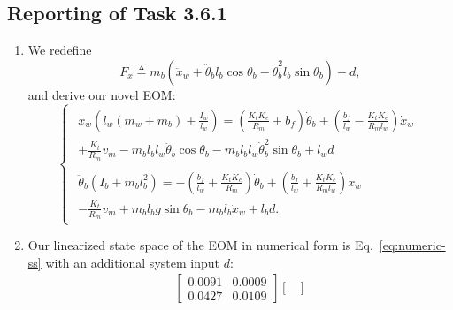 \documentclass[11pt]{article} %
\begin{document}
\subsection*{Reporting of Task 3.6.1}
\begin{enumerate}
\item %
  We redefine
  $$
  F_x \triangleq m_b\left(
    \ddot{x}_w
    + \ddot{\theta}_b l_b \cos\theta_b
    - \dot{\theta}^2_b l_b \sin\theta_b
  \right)
  - d,
  $$
  and derive our novel \ac{EOM}:
  \begin{equation}\label{eq:system-novel}
    \begin{cases}
      \begin{aligned}
        \ddot{x}_w\left(l_w(m_w + m_b) + \frac{I_w}{l_w}\right) =
        \left(
          \frac{K_t K_e}{R_m}
          + b_f
        \right)\dot{\theta}_b
        +
        \left(
          \frac{b_f}{l_w}
          -
          \frac{K_t K_e}{R_m l_w}
        \right)\dot{x}_w
        \\
        + \frac{K_t}{R_m}v_m
        - m_b l_b l_w \ddot{\theta}_b \cos\theta_b
        - m_b l_b l_w \dot{\theta}_b^2 \sin\theta_b
        + l_w d
      \end{aligned}\\
      \begin{aligned}
        \ddot{\theta}_b\left(I_b + m_b l_b^2\right)
        =
        -\left(
          \frac{b_f}{l_w}
          +
          \frac{K_t K_e}{R_m}
        \right)\dot{\theta}_b
        + \left(
          \frac{b_f}{l_w} + \frac{K_t K_e}{R_m l_w}
        \right)\dot{x}_w
        \\
        - \frac{K_t}{R_m}v_m
        + m_b l_b g \sin\theta_b
        - m_b l_b \ddot{x}_w
        + l_b d.
      \end{aligned}
    \end{cases}
  \end{equation}
\item %
  Our linearized state space of the \ac{EOM} in numerical form is Eq.~\eqref{eq:numeric-ss} with an additional system input $d$:
  \begin{equation*}
    \begin{aligned}
      \begin{bmatrix}
        0.0091 & 0.0009 \\
        0.0427 & 0.0109
      \end{bmatrix}
      \begin{bmatrix}

\end{bmatrix}
\end{aligned}
\end{equation*}
\end{enumerate}
\end{document}
